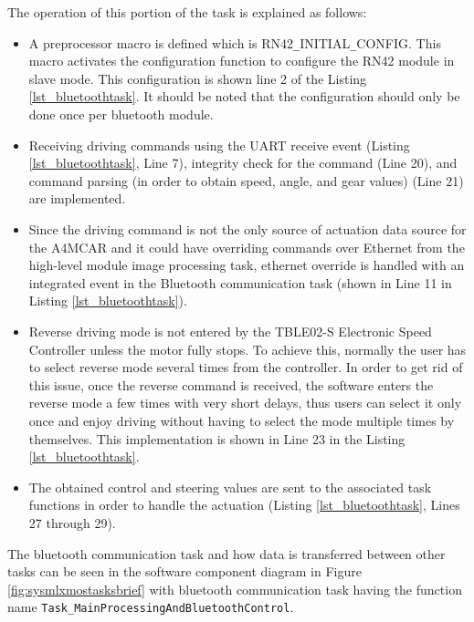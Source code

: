 The operation of this portion of the task is explained as follows:
\begin{itemize}
	\item A preprocessor macro is defined which is RN42\texttt{\_}INITIAL\texttt{\_}CONFIG. This macro activates the configuration function to configure the RN42 module in slave mode. This configuration is shown line 2 of the Listing \ref{lst_bluetoothtask}. It should be noted that the configuration should only be done once per bluetooth module.
	\item Receiving driving commands using  the UART receive event (Listing \ref{lst_bluetoothtask}, Line 7), integrity check for the command (Line 20), and command parsing (in order to obtain speed, angle, and gear values) (Line 21) are implemented.
	\item Since the driving command is not the only source of actuation data source for the A4MCAR and it could have overriding commands over Ethernet from the high-level module image processing task, ethernet override is handled with an integrated event in the Bluetooth communication task (shown in Line 11 in Listing \ref{lst_bluetoothtask}).
	\item Reverse driving mode is not entered by the TBLE02-S Electronic Speed Controller unless the motor fully stops. To achieve this, normally the  user has to select reverse mode several times from the controller. In order to get rid of this issue, once the reverse command is received, the software enters the reverse mode a few times with very short delays, thus users can select it only once and enjoy driving without having to select the mode multiple times by themselves. This implementation is shown in Line 23 in the Listing \ref{lst_bluetoothtask}.
	\item The obtained control and steering values are sent to the associated task functions in order to handle the actuation (Listing \ref{lst_bluetoothtask}, Lines 27 through 29).
\end{itemize}

\newpage


The bluetooth communication task and how data is transferred between other tasks can be seen in the software component diagram in Figure \ref{fig:sysmlxmostasksbrief} with bluetooth communication task having the function name \texttt{Task\texttt{\_}MainProcessingAndBluetoothControl}.


